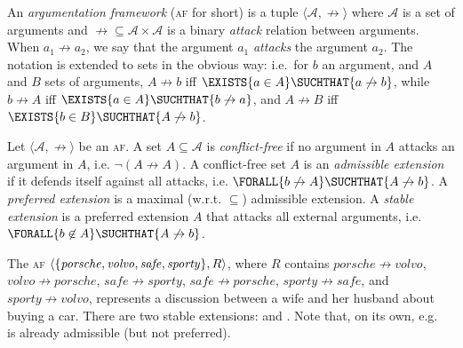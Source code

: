 \documentclass[12pt,a4paper]{article}
\newcommand{\Exists}[2]{\ensuremath{\EXISTS{#1} \SUCHTHAT {#2}}}
\newcommand{\Forall}[2]{\ensuremath{\FORALL{#1} \SUCHTHAT {#2}}}
\newcommand{\mc}[1]{\ensuremath{\mathcal{#1}}}
\newcommand{\attack}{\ensuremath{\not\rightarrow}}
\newcommand{\af}[2]{\ensuremath{\langle{#1},{#2}\rangle}}
\newcommand{\abaf}{\textsc{af}}
\begin{document}
\begin{definition}\label{def-af}
An \emph{argumentation framework} (\abaf{} for short) is a tuple
\af{\mc{A}}{\attack{}}
where $\mc{A}$ is a set of arguments and 
$\attack{} \subseteq \mc{A} \times \mc{A}$
is a binary \emph{attack} relation between arguments. When $a_1 \attack a_2$,
we say that the argument $a_1$ \emph{attacks} the argument
$a_2$. The notation is extended to sets in the obvious way: i.e.~for $b$ an argument, and $A$ and $B$ sets of arguments, 
$A \attack b$ iff
\Exists{a\in A}{a\attack b}, while
$b \attack A$ iff \Exists{a\in A}{b\attack a}, and
$A \attack B$ iff \Exists{b\in B}{A\attack b}.
\end{definition}

\begin{definition}\label{def-afb}
Let \af{\mc{A}}{\attack{}} be an \abaf{}. %
A set $A\subseteq \mc{A}$ is \emph{conflict-free} if
no argument in $A$ attacks an argument in $A$,
i.e. $\neg (A\attack A)$.
A conflict-free set $A$ is an \emph{admissible extension} if it defends
itself against all attacks, i.e. \Forall{b\attack A}{A\attack b}.
A \emph{preferred extension} is a maximal (w.r.t. $\subseteq$) admissible extension.
A \emph{stable extension} is a preferred extension $A$ that attacks all
external arguments, i.e. \Forall{b\not\in A}{A\attack b}.
\end{definition}

\begin{example}\cite{gorkar96}\label{exaf1}
The \abaf{}
\af{\set{\mathit{porsche},\mathit{volvo},\mathit{safe},\mathit{sporty}}}{R},
 where $R$ contains
$\mathit{porsche}\attack\mathit{volvo}$,
$\mathit{volvo}\attack\mathit{porsche}$,
$\mathit{safe}\attack\mathit{sporty}$,
$\mathit{safe}\attack\mathit{porsche}$,
$\mathit{sporty}\attack\mathit{safe} $, and
$\mathit{sporty}\attack\mathit{volvo}$,
represents a discussion between a wife and her
husband about buying a car. There are two stable extensions:
and
. Note that, on its own,
e.g.~ is already admissible (but not preferred).
\end{example}
\end{document}
